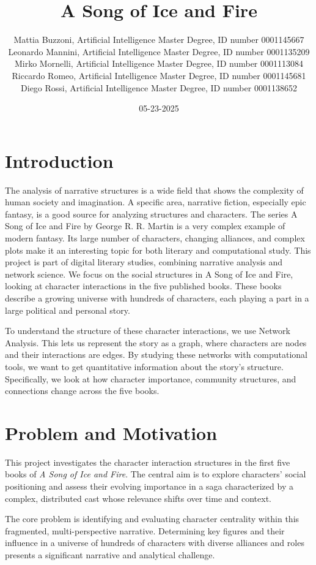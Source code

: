\documentclass[12pt, a4paper]{article}
\author{Mattia Buzzoni, Artificial Intelligence Master Degree, ID number 0001145667
\\Leonardo Mannini, Artificial Intelligence Master Degree, ID number 0001135209
\\Mirko Mornelli, Artificial Intelligence Master Degree, ID number 0001113084
\\Riccardo Romeo, Artificial Intelligence Master Degree, ID number 0001145681
\\Diego Rossi, Artificial Intelligence Master Degree, ID number 0001138652}
\date{05-23-2025}
\title{A Song of Ice and Fire}
\begin{document}
	\maketitle
	
	\section{Introduction}
	\label{introduction}
	The analysis of narrative structures is a wide field that shows the complexity of human society and imagination. A specific area, narrative fiction, especially epic fantasy, is a good source for analyzing structures and characters. The series A Song of Ice and Fire by George R. R. Martin is a very complex example of modern fantasy. Its large number of characters, changing alliances, and complex plots make it an interesting topic for both literary and computational study.
	This project is part of digital literary studies, combining narrative analysis and network science. We focus on the social structures in A Song of Ice and Fire, looking at character interactions in the five published books. These books describe a growing universe with hundreds of characters, each playing a part in a large political and personal story.
	
	To understand the structure of these character interactions, we use  Network Analysis. This lets us represent the story as a graph, where characters are nodes and their interactions are edges. By studying these networks with computational tools, we want to get quantitative information about the story's structure. Specifically, we look at how character importance, community structures, and connections change across the five books.
	
	
	\section{Problem and Motivation}
	\label{problem-and-motivation}
	
	This project investigates the character interaction structures in the first five books of \textit{A Song of Ice and Fire}. The central aim is to explore characters' social positioning and assess their evolving importance in a saga characterized by a complex, distributed cast whose relevance shifts over time and context.

	The core problem is identifying and evaluating character centrality within this fragmented, multi-perspective narrative. Determining key figures and their influence in a universe of hundreds of characters with diverse alliances and roles presents a significant narrative and analytical challenge. 
	
\end{document}
